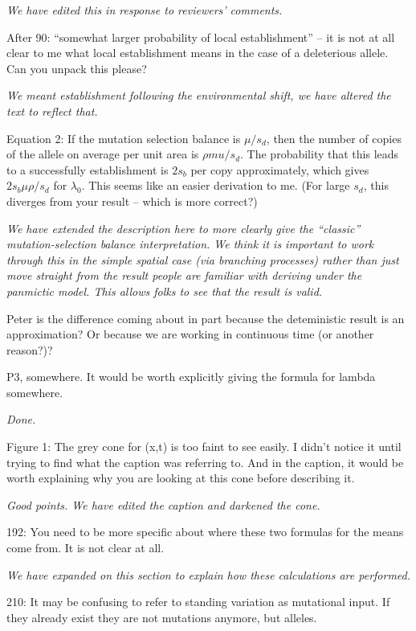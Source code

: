 \documentclass[12pt,letterpaper]{article}
\newcommand{\gc}[1]{{ \color{red} #1}}
\newcommand{\response}[1]{\emph{ \color{blue} #1}}
\begin{document}
\response{We have edited this in response to reviewers' comments.}


After 90: “somewhat larger probability of local establishment” -- it is not at all clear to me what local establishment means in the case of a deleterious allele. Can you unpack this please?

\response{We meant establishment following the environmental shift, we have altered the text to reflect that.}

Equation 2: If the mutation selection balance is $\mu/s_d$, then the number of copies of the allele on average per unit area is $\rho mu/ s_d$. The probability that this leads to a successfully establishment is $2 s_b$ per copy approximately, which gives $2 s_b \mu \rho / s_d$ for $\lambda_0$. This seems like an easier derivation to me. (For large $s_d$, this diverges from your result -- which is more correct?)

\response{We have extended the description here to more clearly give the ``classic'' mutation-selection balance interpretation. We think it is important to work through this in the simple spatial case (via branching processes) rather than just move straight from the result people are familiar with deriving under the panmictic model. This allows folks to see that the result is valid. }

\gc{Peter is the difference coming about in part because the deteministic result is an approximation? Or because we are working in continuous time (or another reason?)?}

P3, somewhere. It would be worth explicitly giving the formula for lambda somewhere.

\response{Done.}

Figure 1: The grey cone for (x,t) is too faint to see easily. I didn't notice it until trying to find what the caption was referring to. And in the caption, it would be worth explaining why you are looking at this cone before describing it. 

\response{Good points. We have edited the caption and darkened the cone. }

192: You need to be more specific about where these two formulas for the means come from. It is not clear at all.

\response{We have expanded on this section to explain how these calculations are performed.}

210: It may be confusing to refer to standing variation as mutational input. If they already exist they are not mutations anymore, but alleles.
\end{document}
